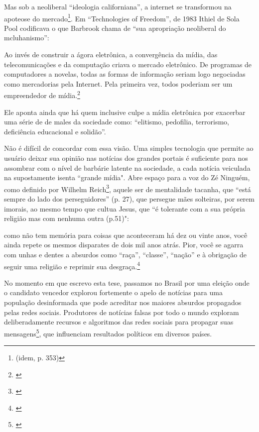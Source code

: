 Mas sob a neoliberal ``ideologia californiana'', a internet se transformou na apoteose do mercado\footnote{(idem, p. 353)}. Em ``Technologies of Freedom'', de 1983 Ithiel de Sola Pool codificava o que Barbrook chama de ``sua apropriação neoliberal do mcluhanismo'':
\begin{citacao}
Ao invés de construir a ágora eletrônica, a convergência da mídia, das telecomunicações e da computação criava o mercado eletrônico. De programas de computadores a novelas, todas as formas de informação seriam logo negociadas como mercadorias pela Internet. Pela primeira vez, todos poderiam ser um empreendedor de mídia.\footnote{\cite[p. 348]{Barbrook2009}}
\end{citacao}

Ele aponta ainda que há quem inclusive culpe a mídia eletrônica por exacerbar uma série de de males da sociedade como: ``elitismo, pedofilia, terrorismo, deficiência educacional e solidão''. 

Não é difícil de concordar com essa visão. Uma simples tecnologia que permite ao usuário deixar sua opinião nas notícias dos grandes portais é suficiente para nos assombrar com o nível de barbárie latente na sociedade, a cada notícia veiculada na supostamente isenta ``grande mídia". Abre espaço para a voz do Zé Ninguém, como definido por Wilhelm Reich\footnote{\cite{reich1998escute}}, aquele ser de mentalidade tacanha, que ``está sempre do lado dos perseguidores'' (p. 27), que persegue mães solteiras, por serem imorais, ao mesmo tempo que cultua Jesus, que ``é tolerante com a sua própria religião mas com nenhuma outra (p.51)":

\begin{citacao}
como não tem memória para coisas que aconteceram há dez ou vinte anos, você ainda repete os mesmos disparates de dois mil anos atrás. Pior, você se agarra com unhas e dentes a absurdos como ``raça'', ``classe'', ``nação'' e à obrigação de seguir uma religião e reprimir sua desgraça.\footnote{\cite[p. 101]{reich1998escute}}
\end{citacao}

No momento em que escrevo esta tese, passamos no Brasil por uma eleição onde o candidato vencedor explorou fortemente o apelo de notícias para uma população desinformada que pode acreditar nos maiores absurdos propagados pelas redes sociais. Produtores de notícias falsas por todo o mundo exploram deliberadamente recursos e algoritmos das redes sociais para propagar suas mensagens\footnote{\cite{Martens2018}}, que influenciam resultados políticos em diversos países.


